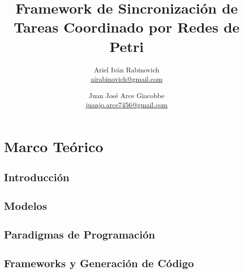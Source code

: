 \documentclass{report}
\date{}
\newcounter{definitionsCounter}
\begin{document}
    \newcommand{\nombreTesis}{Framework de Sincronización de Tareas Coordinado
    por Redes de Petri}
    \newcommand{\nombreFramework}{Baboon}
    \newcommand{\javapetriconcurrencymonitor}{Java Petri Concurrency Monitor }

    \title{\nombreTesis}
    \author{Ariel Iván Rabinovich \\ \href{mailto:airabinovich@gmail.com}{airabinovich@gmail.com}
        \and Juan José Arce Giacobbe \\ \href{mailto:juanjo.arce7546@gmail.com}{juanjo.arce7456@gmail.com}}
    \graphicspath{ {resources/images/} }
    
    \maketitle
    
    \tableofcontents
    
    \listoffigures
    \listoftables
    
    \setcounter{definitionsCounter}{0}
    
    \part{Marco Teórico}
        \chapter{Introducción}
            
        \chapter{Modelos}
            
        \chapter{Paradigmas de Programación}
            
            
            
        \chapter{Frameworks y Generación de Código}
            
            
\end{document}

